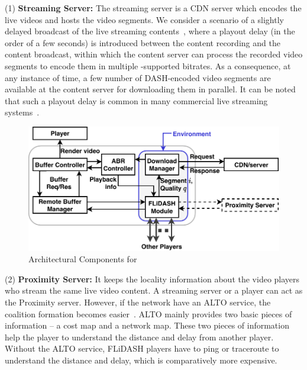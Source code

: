\noindent (1) {\bf Streaming Server:} The streaming server is a \ac{CDN} server which encodes the live videos and hosts the video segments. We consider a scenario of a slightly delayed broadcast of the live streaming contents~\cite{huysegems2015http}, where a playout delay (in the order of a few seconds) is introduced between the content recording and the content broadcast, within which the content server can process the recorded video segments to encode them in multiple -supported bitrates. As a consequence, at any instance of time, a few number of DASH-encoded video segments are available at the content server for downloading them in parallel. It can be noted that such a playout delay is common in many commercial live streaming systems~\cite{zinner2017comparison}. 
\begin{figure}[!ht]
	\centering
	\includegraphics[width=0.8\linewidth]{img/PlayerDiagram}
	\caption{\label{fig:chap06:playerdiagram} Architectural Components for \our}
\end{figure}

\noindent (2) {\bf Proximity Server:} It keeps the locality information about the video players who stream the same live video content. A streaming server or a player can act as the Proximity server. However, if the network have an \ac{ALTO} service, the coalition formation becomes easier~\cite{alimi2014application}. \ac{ALTO} mainly provides two basic pieces of information -- a cost map and a network map. These two pieces of information help the player to understand the distance and delay from another player. Without the \ac{ALTO} service, FLiDASH players have to ping or traceroute to understand the distance and delay, which is comparatively more expensive.


